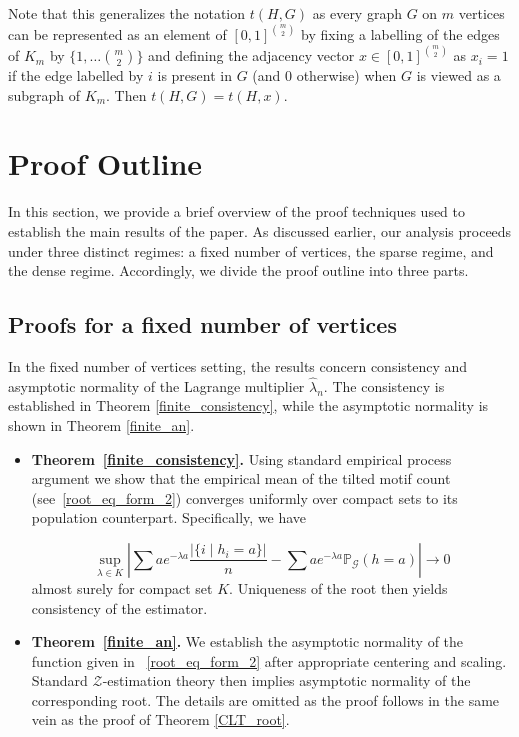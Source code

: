 \documentclass[12pt]{article}
\numberwithin{equation}{section}
\begin{document}
Note that this generalizes the notation \(t(H,G)\) as every graph \(G\) on \(m\) vertices can be represented as an element of \([0,1]^{{m\choose 2}}\) by fixing a labelling of the edges of \(K_m\) by \(\{1,\ldots {m\choose 2}\}\) and defining the adjacency vector \(x\in [0,1]^{{m\choose 2}}\) as \(x_i = 1\) if the edge labelled by \(i\) is present in \(G\) (and \(0\) otherwise) when \(G\) is viewed as a subgraph of \(K_m\). Then \(t(H,G) = t(H,x)\). 

\section{Proof Outline \label{sec:proof_outline}}

In this section, we provide a brief overview of the proof techniques used to establish the main results of the paper. As discussed earlier, our analysis proceeds under three distinct regimes: a fixed number of vertices, the sparse regime, and the dense regime. Accordingly, we divide the proof outline into three parts.

\subsection{Proofs for a fixed number of vertices}

In the fixed number of vertices setting, the results concern consistency and asymptotic normality of the Lagrange multiplier $\hat{\lambda}_n$. The consistency is established in Theorem \ref{finite_consistency}, while the asymptotic normality is shown in Theorem \ref{finite_an}.

\begin{itemize}
    \item \textbf{Theorem~\ref{finite_consistency}.} Using standard empirical process argument we show that the empirical mean of the tilted motif count
    (see~\eqref{root_eq_form_2}) converges uniformly over compact sets to its population counterpart. Specifically, we have

    \[
\sup\limits_{\lambda\in K}^{} \left\lvert \sum a e^{-\lambda a}\frac{\lvert\{i\mid h_i=a\}\rvert}{n} - \sum a e^{-\lambda a}\mathbb{P}_{\mathcal{G}}(h=a)\right\rvert \rightarrow 0
\]
almost surely for compact set $K$.
    Uniqueness of the root then yields consistency of the estimator.\\
    
    \item \textbf{Theorem~\ref{finite_an}.} We establish the asymptotic normality of the function given in ~\eqref{root_eq_form_2} after appropriate centering and scaling. Standard
    $\mathcal{Z}$-estimation theory then implies asymptotic normality of the corresponding root. The details are omitted as the proof follows in the same vein as the proof of Theorem \ref{CLT_root}.
\end{itemize}
\end{document}
